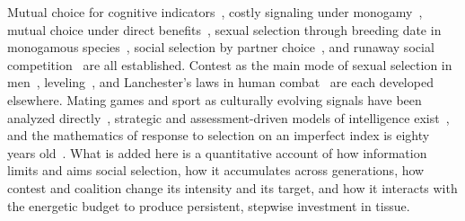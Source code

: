 Mutual choice for cognitive indicators~\cite{miller2000ch,miller2000book}, costly signaling under
monogamy~\cite{hooper2008,grafen1990}, mutual choice under direct benefits~\cite{courtiol2016}, sexual selection through
breeding date in monogamous species~\cite{kirkpatrick1990}, social selection by partner
choice~\cite{westeberhard1983,nesse2007}, and runaway social competition~\cite{alexander1989,flinn2005,crespi2022} are all
established. Contest as the main mode of sexual selection in men~\cite{puts2010}, leveling~\cite{boehm1999,gavrilets2012},
and Lanchester's laws in human combat~\cite{johnson2015} are each developed elsewhere. Mating games and sport as culturally
evolving signals have been analyzed directly~\cite{deblock2007,deblock2009}, strategic and assessment-driven models of
intelligence exist~\cite{gavrilets2006,baroudagues2022}, and the mathematics of response to selection on an imperfect index is
eighty years old~\cite{lush1937,hazel1943,crow1958}. What is added here is a quantitative account of how information limits
and aims social selection, how it accumulates across generations, how contest and coalition change its intensity and its
target, and how it interacts with the energetic budget to produce persistent, stepwise investment in tissue.
